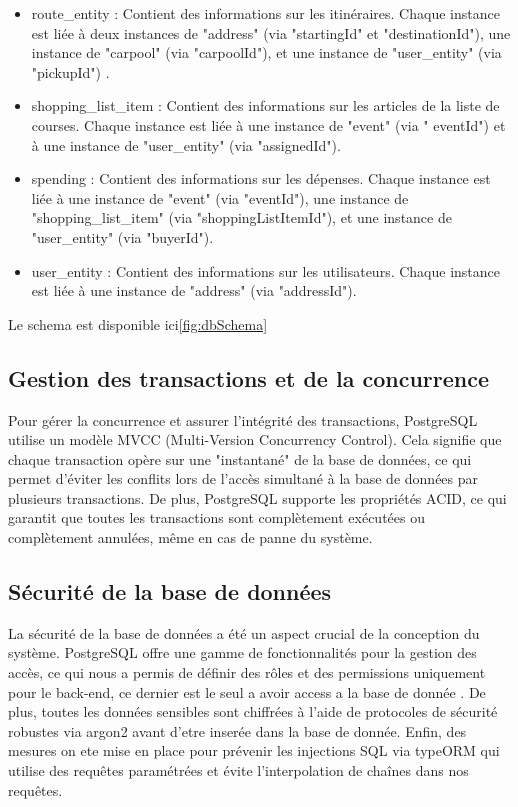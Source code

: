 \begin{itemize}
    \item route\_entity : Contient des informations sur les itinéraires.
    Chaque instance est liée à deux instances de "address" (via "startingId" et "destinationId"), une instance de "carpool" (via "carpoolId"), et une instance de "user\_entity" (via "pickupId") .\\
    \item shopping\_list\_item : Contient des informations sur les articles de la liste de courses.
    Chaque instance est liée à une instance de "event" (via " eventId") et à une instance de "user\_entity" (via "assignedId").\\
    \item spending : Contient des informations sur les dépenses.
    Chaque instance est liée à une instance de "event" (via "eventId"), une instance de "shopping\_list\_item" (via "shoppingListItemId"), et une instance de "user\_entity" (via "buyerId").\\
    \item user\_entity : Contient des informations sur les utilisateurs.
    Chaque instance est liée à une instance de "address" (via "addressId").\\
\end{itemize}

Le schema est disponible ici\ref{fig:dbSchema}%

\subsection{Gestion des transactions et de la concurrence}\label{subsec:transaction-concurrency}
Pour gérer la concurrence et assurer l'intégrité des transactions, PostgreSQL utilise un modèle MVCC (Multi-Version Concurrency Control).
Cela signifie que chaque transaction opère sur une "instantané" de la base de données, ce qui permet d'éviter les conflits lors de l'accès simultané à la base de données par plusieurs transactions.
De plus, PostgreSQL supporte les propriétés ACID, ce qui garantit que toutes les transactions sont complètement exécutées ou complètement annulées, même en cas de panne du système.\\

\subsection{Sécurité de la base de données}\label{subsec:database-security}
La sécurité de la base de données a été un aspect crucial de la conception du système.
PostgreSQL offre une gamme de fonctionnalités pour la gestion des accès, ce qui nous a permis de définir des rôles et des permissions uniquement pour le back-end, ce dernier est le seul a avoir access a la base de donnée .
De plus, toutes les données sensibles sont chiffrées à l'aide de protocoles de sécurité robustes via argon2 avant d'etre inserée dans la base de donnée.
Enfin, des mesures on ete mise en place pour prévenir les injections SQL via typeORM qui utilise des requêtes paramétrées et évite l'interpolation de chaînes dans nos requêtes.\\

